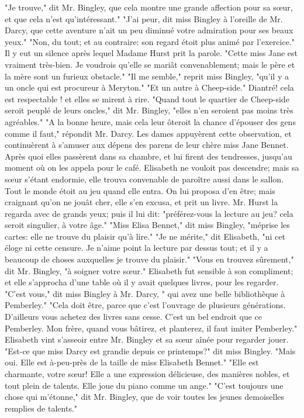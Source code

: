"Je trouve," dit Mr. Bingley, que cela montre une grande affection pour sa sœur, et que cela n'est qu'intéressant."
"J'ai peur, dit miss Bingley à l'oreille de Mr. Darcy, que cette aventure n'ait un peu diminué votre admiration pour ses beaux yeux."
"Non, du tout; et au contraire: son regard étoit plus animé par l'exercice."
Il y eut un silence après lequel Madame Hurst prit la parole. "Cette miss Jane est vraiment très-bien. Je voudrois qu’elle se mariât convenablement; mais le père et la mère sont un furieux obstacle."
"Il me semble," reprit miss Bingley, "qu’il y a un oncle qui est procureur à Meryton."
"Et un autre à Cheep-side."\setcounter{page}{391} Diantré! cela est respectable ! et elles se mirent à rire.
"Quand tout le quartier de Cheep-side seroit peuplé de leurs oncles," dit Mr. Bingley, "elles n'en seroient pas moins très agréables."
"A la bonne heure, mais cela leur ôteroit la chance d'épouser des gens comme il faut," répondit Mr. Darcy.
Les dames appuyèrent cette observation, et continuèrent à s'amuser aux dépens des parens de leur chère miss Jane Bennet. Après quoi elles passèrent dans sa chambre, et lui firent des tendresses, jusqu'au moment où on les appela pour le café. Elisabeth ne vouloit pas descendre; mais sa sœur s'étant endormie, elle trouva convenable de paroître aussi dans le sallon. Tout le monde étoit au jeu quand elle entra. On lui proposa d'en être; mais craignant qu'on ne jouât cher, elle s'en excusa, et prit un livre. Mr. Hurst la regarda avec de grands yeux; puis il lui dit: "préférez-vous la lecture au jeu? cela seroit singulier, à votre âge."
"Miss Elisa Bennet," dit miss Bingley, "méprise les cartes: elle ne trouve du plaisir qu'à lire."
"Je ne mérite," dit Elisabeth, "ni cet éloge ni cette censure. Je n'aime point la\setcounter{page}{392} lecture par dessus tout; et il y a beaucoup de choses auxquelles je trouve du plaisir." "Vous en trouvez sûrement," dit Mr. Bingley, "à soigner votre sœur." Elisabeth fut sensible à son compliment; et elle s'approcha d'une table où il y avait quelques livres, pour les regarder. "C'est vous," dit miss Bingley à Mr. Darcy, " qui avez une belle bibliothèque à Pemberley." "Cela doit être, parce que c'est l'ouvrage de plusieurs générations. D'ailleurs vous achetez des livres sans cesse. C'est un bel endroit que ce Pemberley. Mon frère, quand vous bâtirez, et planterez, il faut imiter Pemberley." Elisabeth vint s'asseoir entre Mr. Bingley et sa sœur aînée pour regarder jouer. "Est-ce que miss Darcy est grandie depuis ce printemps?" dit miss Bingley. "Mais oui. Elle est à-peu-près de la taille de miss Elisabeth Bennet." "Elle est charmante, votre sœur! Elle a une expression délicieuse, des manières nobles, et tout plein de talents. Elle joue du piano comme un ange." "C'est toujours une chose qui m'étonne," dit Mr. Bingley, que de voir toutes les jeunes demoiselles remplies de talents."
